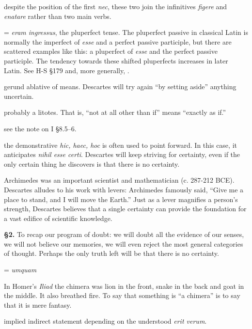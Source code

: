  despite the position of the first \textit{nec}, these two join the infinitives \textit{figere} and \textit{enatare} rather than two main verbs.

 = \textit{eram ingressus}, the pluperfect tense. The pluperfect passive in classical Latin is normally the imperfect of \textit{esse} and a perfect passive participle, but there are scattered examples like this: a pluperfect of \textit{esse} and the perfect passive participle. The tendency towards these shifted pluperfects increases in later Latin. See H-S §179 and, more generally, \cite[§298]{väänänen1981}.

 gerund ablative of means. Descartes will try again ``by setting aside'' anything uncertain.

 probably a litotes. That is, ``not at all other than if'' means ``exactly as if.''

 see the note on I §8.5--6.

 the demonstrative \textit{hic, haec, hoc} is often used to point forward. In this case, it anticipates \textit{nihil esse certi}. Descartes will keep striving for certainty, even if the only certain thing he discovers is that there is no certainty.

 Archimedes was an important scientist and mathematician (c. 287-212 BCE). Descartes alludes to his work with levers: Archimedes famously said, ``Give me a place to stand, and I will move the Earth.'' Just as a lever magnifies a person's strength, Descartes believes that a single certainty can provide the foundation for a vast edifice of scientific knowledge.

\textbf{§2.} To recap our program of doubt: we will doubt all the evidence of our senses, we will not believe our memories, we will even reject the most general categories of thought. Perhaps the only truth left will be that there is no certainty.

 = \textit{umquam}

 In Homer's \textit{Iliad} the chimera was lion in the front, snake in the back and goat in the middle. It also breathed fire. To say that something is ``a chimera'' is to say that it is mere fantasy.

 implied indirect statement depending on the understood \textit{erit verum}.


